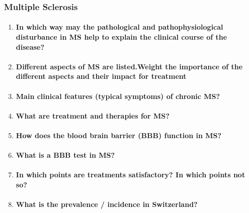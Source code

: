 \documentclass[12pt,article,oneside,a4paper]{memoir}
\begin{document}
\subsubsection{Multiple Sclerosis}
\begin{enumerate}
\item \paragraph{In which way may the pathological and pathophysiological disturbance in MS help to explain the clinical course of the disease?}

\item \paragraph{Different aspects of MS are listed.Weight the importance of the different aspects and their impact for treatment}

\item \paragraph{Main clinical features (typical symptoms) of chronic MS?}

\item \paragraph{What are treatment and therapies for MS?}

\item \paragraph{How does the blood brain barrier (BBB) function in MS?}

\item \paragraph{What is a BBB test in MS?}

\item \paragraph{In which points are treatments satisfactory?  In which points not so?}

\item \paragraph{What is the prevalence / incidence in Switzerland?}


\end{enumerate}
\end{document}
